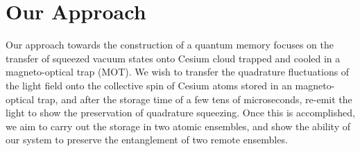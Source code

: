 \section{Our Approach}

Our approach towards the construction of a quantum memory focuses on the
transfer of squeezed vacuum states onto Cesium cloud trapped and cooled in a
magneto-optical trap (MOT).  We wish to transfer the quadrature fluctuations of the light field onto the collective spin of Cesium atoms stored in an magneto-optical trap, and after the storage time of a few tens of microseconds, re-emit the light to show the preservation of quadrature squeezing.  Once this is accomplished, we aim to carry out the storage in two atomic ensembles, and show the ability of our system to preserve the entanglement of two remote ensembles.

